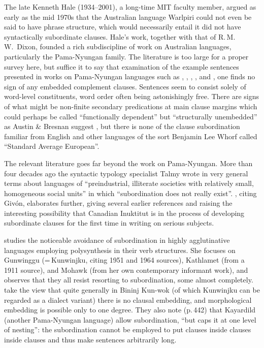\documentclass[output=paper,colorlinks,citecolor=brown
]{langscibook}
\begin{document}
The late Kenneth Hale (1934--2001), a long-time MIT faculty member,
argued as early as the mid 1970s that the Australian language Warlpiri
could not even be said to have phrase structure, which would necessarily
entail it did not have syntactically subordinate clauses. Hale's work,
together with that of R.\,M.\,W.\ Dixon, founded a rich subdiscipline
of work on Australian languages, particularly the Pama-Nyungan family.
The literature is too large for a proper survey here, but suffice it to
say that examination of the example sentences presented in works on
Pama-Nyungan languages such as \citet{Hale76}, \citet{Nash80},
\citet{Dixon81}, \citet{AustBres96}, and \citet{Pensalfini04},
one finds no sign of any embedded complement clauses. Sentences
seem to consist solely of word-level constituents, word order often
being astonishingly free. There are signs of what might be non-finite
secondary predications at main clause margins which could perhaps be
called ``functionally dependent'' but ``structurally unembedded'' as
Austin \& Bresnan suggest \citeyearpar[228, esp.\ n.\,13]{AustBres96},
but there is none of the clause subordination familiar from English
and other languages of the sort Benjamin Lee Whorf called
``Standard Average European''.

The relevant literature goes far beyond the work on Pama-Nyungan.
More than four decades ago the syntactic typology
specialist Talmy \citet[298]{Givon79} wrote in very
general terms about languages of ``preindustrial, illiterate societies
with relatively small, homogeneous social units'' in which
``subordination does not really exist''. \citet[esp.\ pp.\,157--159]{Kalmar85}, citing Giv{\'o}n,
elaborates further, giving several earlier references and raising the
interesting possibility that Canadian Inuktitut is in the process of
developing subordinate clauses for the first time in writing on serious
subjects.

\citet{Mithun84} studies the noticeable avoidance of subordination
in highly agglutinative languages employing polysynthesis in their
verb structures. She focuses on Gunwinggu (=\,Kunwinjku, citing 1951
and 1964 sources), Kathlamet (from a 1911 source), and Mohawk (from
her own contemporary informant work), and observes that they all
resist resorting to subordination, some almost completely. \citet[Section~6]{EvanLevi09} take the view that quite
generally in Bininj Kun-wok (of which Kunwinjku can be regarded as a
dialect variant) there is no clausal embedding, and morphological
embedding is possible only to one degree. They also note (p.\,442)
that Kayardild (another Pama-Nyungan language) allow subordination,
``but caps it at one level of nesting'': the subordination cannot be
employed to put clauses inside clauses inside clauses and thus make
sentences arbitrarily long.
\end{document}
